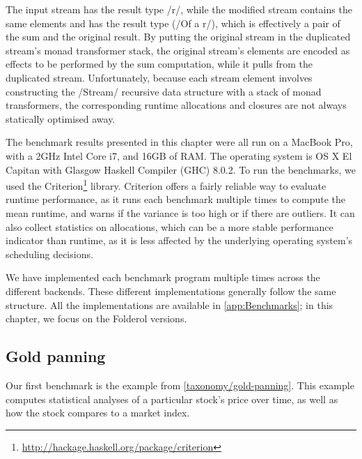 The input stream has the result type \Hs/r/, while the modified stream contains the same elements and has the result type (\Hs/Of a r/), which is effectively a pair of the sum and the original result.
By putting the original stream in the duplicated stream's monad transformer stack, the original stream's elements are encoded as effects to be performed by the sum computation, while it pulls from the duplicated stream.
Unfortunately, because each stream element involves constructing the \Hs/Stream/ recursive data structure with a stack of monad transformers, the corresponding runtime allocations and closures are not always statically optimised away.

The benchmark results presented in this chapter were all run on a MacBook Pro, with a 2GHz Intel Core i7, and 16GB of RAM.
The operating system is OS X El Capitan with Glasgow Haskell Compiler (GHC) 8.0.2.
To run the benchmarks, we used the Criterion\footnote{\url{http://hackage.haskell.org/package/criterion}} library.
Criterion offers a fairly reliable way to evaluate runtime performance, as it runs each benchmark multiple times to compute the mean runtime, and warns if the variance is too high or if there are outliers.
It can also collect statistics on allocations, which can be a more stable performance indicator than runtime, as it is less affected by the underlying operating system's scheduling decisions.

We have implemented each benchmark program multiple times across the different backends.
These different implementations generally follow the same structure.
All the implementations are available in \cref{app:Benchmarks}; in this chapter, we focus on the Folderol versions.

\subsection{Gold panning}

Our first benchmark is the \Hs@priceAnalyses@ example from \cref{taxonomy/gold-panning}.
This example computes statistical analyses of a particular stock's price over time, as well as how the stock compares to a market index.

